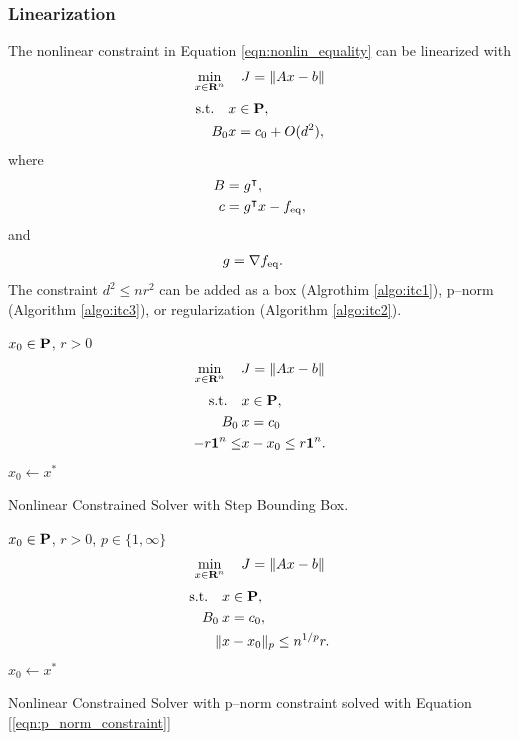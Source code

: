 \documentclass{article}
\begin{document}
\subsubsection{Linearization}

    The nonlinear constraint in Equation \ref{eqn:nonlin_equality} can be linearized with
    \begin{align*}
        \min_{x\in\textbf{R}^n} \quad J = \|Ax-b\|
    \end{align*}
    \begin{align*}
        \text{s.t.} \quad &x\in\textbf{P},\\
        B_{0}&x=c_{0}+O(d^2),
    \end{align*}
    where
    \begin{align*}
        B &= g^\intercal,\\
        c &= g^\intercal x - f_{\text{eq}},
    \end{align*}
    and
    \begin{align*}
        g &= \nabla f_{\text{eq}}.
    \end{align*}
    The constraint $d^2\leq n r^2$ can be added as a box (Algrothim \ref{algo:itc1}),
    p--norm (Algorithm \ref{algo:itc3}), or 
    regularization (Algorithm \ref{algo:itc2}).

    \clearpage

    \begin{algorithm}[H]
        \SetAlgoLined
        $x_0 \in\textbf{P}$, $r>0$\\
        {
            \begin{align*}
                \min_{x\in\textbf{R}^n}\quad J = \|Ax-b\|
            \end{align*}
            \begin{align*}
                \text{s.t.} \quad &x\in\textbf{P},\\
                B_{0}\:&x=c_{0}\\
                -r\textbf{1}^n\leq&x-x_0\leq r\textbf{1}^n.
            \end{align*}
            $x_0\leftarrow x^*$
        }
    \caption{Nonlinear Constrained Solver with Step Bounding Box.}
    \label{algo:itc1}
    \end{algorithm}     
    
    \begin{algorithm}[H]
        \SetAlgoLined
        $x_0 \in\textbf{P}$, $r>0$, $p\in\{1,\infty\}$\\
        {
            \begin{align*}
                \min_{x\in\textbf{R}^n}\quad J = \|Ax-b\|
            \end{align*}
            \begin{align*}
                \text{s.t.} \quad &x\in\textbf{P},\\
                B_{0}\:&x=c_{0},\\
                \|&x-x_0\|_p\leq n^{1/p}r.
            \end{align*}
            $x_0\leftarrow x^*$
        }
    \caption{Nonlinear Constrained Solver with p--norm constraint 
    solved with Equation [\ref{eqn:p_norm_constraint}]}
    \label{algo:itc3}
    \end{algorithm} 
\end{document}

